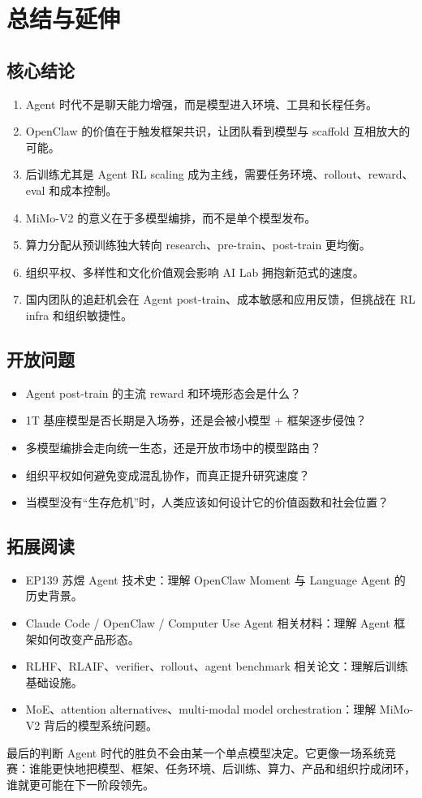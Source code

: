 \section{总结与延伸}

\subsection{核心结论}

\begin{enumerate}
\item Agent 时代不是聊天能力增强，而是模型进入环境、工具和长程任务。
\item OpenClaw 的价值在于触发框架共识，让团队看到模型与 scaffold 互相放大的可能。
\item 后训练尤其是 Agent RL scaling 成为主线，需要任务环境、rollout、reward、eval 和成本控制。
\item MiMo-V2 的意义在于多模型编排，而不是单个模型发布。
\item 算力分配从预训练独大转向 research、pre-train、post-train 更均衡。
\item 组织平权、多样性和文化价值观会影响 AI Lab 拥抱新范式的速度。
\item 国内团队的追赶机会在 Agent post-train、成本敏感和应用反馈，但挑战在 RL infra 和组织敏捷性。
\end{enumerate}

\subsection{开放问题}

\begin{itemize}
\item Agent post-train 的主流 reward 和环境形态会是什么？
\item 1T 基座模型是否长期是入场券，还是会被小模型 + 框架逐步侵蚀？
\item 多模型编排会走向统一生态，还是开放市场中的模型路由？
\item 组织平权如何避免变成混乱协作，而真正提升研究速度？
\item 当模型没有“生存危机”时，人类应该如何设计它的价值函数和社会位置？
\end{itemize}

\subsection{拓展阅读}

\begin{itemize}
\item EP139 苏煜 Agent 技术史：理解 OpenClaw Moment 与 Language Agent 的历史背景。
\item Claude Code / OpenClaw / Computer Use Agent 相关材料：理解 Agent 框架如何改变产品形态。
\item RLHF、RLAIF、verifier、rollout、agent benchmark 相关论文：理解后训练基础设施。
\item MoE、attention alternatives、multi-modal model orchestration：理解 MiMo-V2 背后的模型系统问题。
\end{itemize}

\begin{importantbox}{最后的判断}
Agent 时代的胜负不会由某一个单点模型决定。它更像一场系统竞赛：谁能更快地把模型、框架、任务环境、后训练、算力、产品和组织拧成闭环，谁就更可能在下一阶段领先。
\end{importantbox}



